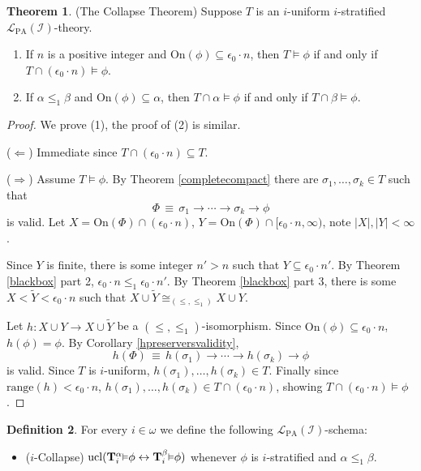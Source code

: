 \documentclass[reqno]{article}
\theoremstyle{definition}
\newtheorem{theorem}{Theorem}
\newtheorem{definition}[theorem]{Definition}
\def\L{\mathscr{L}}
\def\T{\mathbf{T}}
\def\LPA{\L_{\mathrm{PA}}}
\def\indset{\mathcal I}
\def\onset{\mathrm{On}}
\newcommand{\Prr}[2]{\T^{#1}_{#2}\mbox{\small${\vDash}$}}
\newcommand{\ucl}[1]{\mathrm{ucl}(#1)}
\begin{document}
\begin{theorem}
\label{collapsetheorem}
(The Collapse Theorem)
Suppose $T$ is an $i$-uniform $i$-stratified $\LPA(\indset)$-theory.
\begin{enumerate}
\item If $n$ is a positive integer and $\onset(\phi)\subseteq\epsilon_0\cdot n$, then $T\models\phi$
if and only if $T\cap(\epsilon_0\cdot n)\models\phi$.
\item If $\alpha\leq_1\beta$ and $\onset(\phi)\subseteq\alpha$, then $T\cap\alpha\models\phi$
if and only if $T\cap\beta\models\phi$.
\end{enumerate}
\end{theorem}

\begin{proof}
We prove (1), the proof of (2) is similar.
\item
($\Leftarrow$) Immediate since $T\cap(\epsilon_0\cdot n)\subseteq T$.

\item
($\Rightarrow$)
Assume $T\models\phi$.
By Theorem \ref{completecompact} there are $\sigma_1,\ldots,\sigma_k\in T$
such that
\[
\Phi \,\equiv\, \sigma_1\rightarrow\cdots\rightarrow \sigma_k\rightarrow\phi
\]
is valid.
Let $X=\onset(\Phi)\cap(\epsilon_0\cdot n)$, $Y=\onset(\Phi)\cap[\epsilon_0\cdot n,\infty)$, note $|X|,|Y|<\infty$.

Since $Y$ is finite, there is some integer $n'>n$ such that $Y\subseteq\epsilon_0\cdot n'$.
By Theorem \ref{blackbox} part 2, $\epsilon_0\cdot n\leq_1\epsilon_0\cdot n'$.
By Theorem \ref{blackbox} part 3, there is some $X<\widetilde Y<\epsilon_0\cdot n$ such that
$X\cup\widetilde Y\cong_{(\leq,\leq_1)}X\cup Y$.

Let $h:X\cup Y\to X\cup\widetilde Y$ be a $(\leq,\leq_1)$-isomorphism.
Since $\onset(\phi)\subseteq\epsilon_0\cdot n$, $h(\phi)=\phi$.
By Corollary \ref{hpreserversvalidity},
\[
h(\Phi)\,\equiv\, h(\sigma_1)\rightarrow\cdots\rightarrow h(\sigma_k)\rightarrow \phi
\]
is valid.
Since $T$ is $i$-uniform, $h(\sigma_1),\ldots,h(\sigma_k)\in T$.
Finally since $\mathrm{range}(h)<\epsilon_0\cdot n$, $h(\sigma_1),\ldots,h(\sigma_k)\in T\cap(\epsilon_0\cdot n)$,
showing $T\cap(\epsilon_0\cdot n)\models \phi$.
\end{proof}


\begin{definition}
For every $i\in\omega$ we define the following $\LPA(\indset)$-schema:
\begin{itemize}
\item ($i$-Collapse) $\ucl{\Prr\alpha i\phi\leftrightarrow\Prr\beta i\phi}$ whenever $\phi$ is $i$-stratified and $\alpha\leq_1\beta$.
\end{itemize}
\end{definition}
\end{document}
